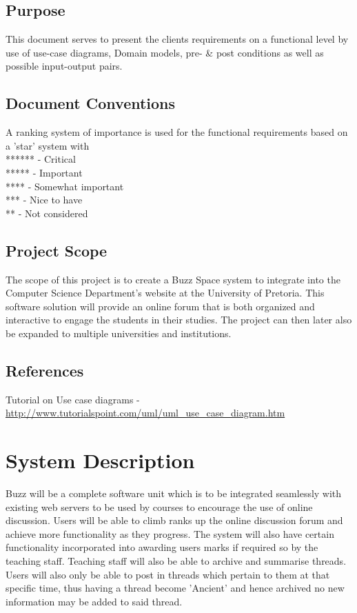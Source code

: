 \documentclass[12pt]{article}
\begin{document}
\subsection{Purpose}
This document serves to present the clients requirements on a functional level by use of use-case diagrams, Domain models, pre- \& post conditions as well as possible input-output pairs.

\subsection{Document Conventions}
A ranking system of importance is used for the functional requirements based on a 'star' system with 
\\****** - Critical
\\*****  - Important
\\ ****  - Somewhat important
\\  ***  - Nice to have
\\  **   - Not considered


\subsection{Project Scope}
The scope of this project is to create a Buzz Space system to integrate into the Computer Science Department's website at the University of Pretoria. This software solution will provide an online forum that is both organized and interactive to engage the students in their studies. The project can then later also be expanded to multiple universities and institutions.

\subsection{References}
Tutorial on Use case diagrams - \url{http://www.tutorialspoint.com/uml/uml_use_case_diagram.htm}

\section{System Description}
Buzz will be a complete software unit which is to be integrated seamlessly with existing web servers to be used by courses to encourage the use of online discussion. Users will be able to climb ranks up the online discussion forum and achieve more functionality as they progress. The system will also have certain functionality incorporated into awarding users marks if required so by the teaching staff. Teaching staff will also be able to archive and summarise threads. Users will also only be able to post in threads which pertain to them at that specific time, thus having a thread become 'Ancient' and hence archived no new information may be added to said thread.
\newpage %
\end{document}
